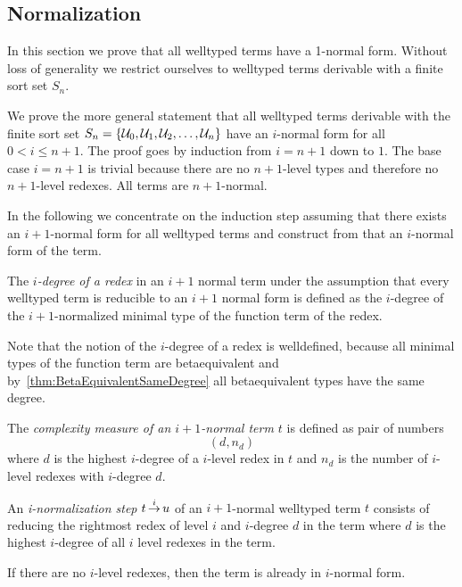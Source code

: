 \subsection{Normalization}

In this section we prove that all welltyped terms have a 1-normal form. Without
loss of generality we restrict ourselves to welltyped terms derivable with a
finite sort set $S_n$.

We prove the more general statement that all welltyped terms derivable with the
finite sort set $S_n = {\left\{{\cal U}_0, {\cal U}_1, {\cal U}_2, \ldots, {\cal U}_n\right\}}$ have an
$i$-normal form for all $0 < i \le n + 1$. The proof goes by induction from $i =
n+1$ down to $1$. The base case $i = n + 1$ is trivial because there are no
$n+1$-level types and therefore no $n+1$-level redexes. All terms are
$n+1$-normal.

In the following we concentrate on the induction step assuming that there exists
an $i+1$-normal form for all welltyped terms and construct from that an
$i$-normal form of the term.

\begin{definition}
    The \emph{$i$-degree of a redex}
    in an $i+1$ normal term under the assumption
    that every welltyped term is reducible to an $i+1$ normal form is defined as
    the $i$-degree of the $i+1$-normalized minimal type of the function term of
    the redex.

    Note that the notion of the $i$-degree of a redex is welldefined, because
    all minimal types of the function term are betaequivalent and
    by~\ref{thm:BetaEquivalentSameDegree} all betaequivalent types have the same
    degree.
\end{definition}



\begin{definition}
    The \emph{complexity measure of an $i+1$-normal term $t$}
    is defined as pair of numbers
    $$
        (d, n_d)
    $$
    where $d$ is the highest $i$-degree of a $i$-level redex in $t$ and $n_d$ is the
    number of $i$-level redexes with $i$-degree $d$.
\end{definition}


\begin{definition}
    An \emph{i-normalization step} $t {\,\stackrel{i}{\to}\,} u$
    of an $i+1$-normal welltyped
    term $t$ consists of reducing the rightmost redex of level $i$ and $i$-degree
    $d$ in the term where $d$ is the highest $i$-degree of all $i$ level redexes in
    the term.

    If there are no $i$-level redexes, then the term is already in $i$-normal
    form.
\end{definition}






